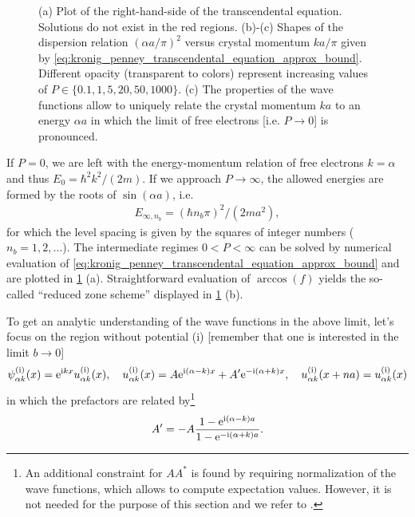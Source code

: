 \begin{figure}
    \caption{
    (a) Plot of the right-hand-side of the transcendental equation. Solutions do not exist in the red regions.
    (b)-(c) Shapes of the dispersion relation $(\alpha a/\pi)^2$ versus crystal momentum $ka/\pi$ given by \cref{eq:kronig_penney_transcendental_equation_approx_bound}.
    Different opacity (transparent to colors) represent increasing values of $P\in\{0.1,1,5,20,50,1000\}$.
    (c) The properties of the wave functions allow to uniquely relate the crystal momentum $ka$ to an energy $\alpha a$ in which the limit of free electrons [i.e. $P\rightarrow0$] is pronounced.}
    \label{fig:kronig_penney_dispersion}
\end{figure}

If $P=0$, we are left with the energy-momentum relation of free electrons $k=\alpha$ and thus $E_0={\hbar^2k^2}/({2m})$.
If we approach $P\rightarrow\infty$, the allowed energies are formed by the roots of $\sin(\alpha a)$, i.e.
\begin{align}
    E_{\infty,n_b}=(\hbar n_b\pi)^2/(2ma^2),
    \label{eq:kronig_penney_energy_tb}
\end{align}
for which the level spacing is given by the squares of integer numbers ($n_b=1,2,\dots$).
The intermediate regimes $0<P<\infty$ can be solved by numerical evaluation of \cref{eq:kronig_penney_transcendental_equation_approx_bound} and are plotted in \cref{fig:kronig_penney_dispersion} (a).
Straightforward evaluation of $\arccos(f)$ yields the so-called ``reduced zone scheme'' displayed in \cref{fig:kronig_penney_dispersion} (b).

To get an analytic understanding of the wave functions in the above limit, let's focus on the region without potential (i) [remember that one is interested in the limit $b\rightarrow0$]
\begin{align}
    \psi_{\alpha k}^{\rm (i)}(x) = \mathrm e^{\mathrm i kx}u_{\alpha k}^{\rm (i)}(x),
    \quad
    u_{\alpha k}^{\rm (i)}(x) = A\mathrm e^{\mathrm i(\alpha-k) x} + A'\mathrm e^{-\mathrm i(\alpha+k) x},
    \quad
    u_{\alpha k}^{\rm (i)}(x+na)=u_{\alpha k}^{\rm (i)}(x)
    \label{eq:kronig_penney_wavefunctions}
\end{align}
in which the prefactors are related by\footnote{An additional constraint for $AA^*$ is found by requiring normalization of the wave functions, which allows to compute expectation values. However, it is not needed for the purpose of this section and we refer to \cite{KronigPenney1931}.}
\begin{align}
    A' = -A\frac{1-\mathrm e^{\mathrm i(\alpha-k)a}}{1-\mathrm e^{-\mathrm i(\alpha+k)a}}.
    \label{eq:kronig_penney_constants}
\end{align}

